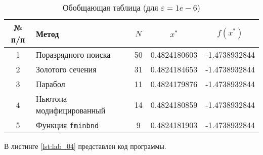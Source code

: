 \documentclass{bmstu}
\begin{document}
\begin{table}[H]
    \centering
	\caption{Обобщающая таблица (для $\varepsilon = 1e-6$)}
    \label{tbl:task}
	\begin{tabular}{|c|l|c|c|c|}
        \hline
        № п/п & Метод & $N$ & $x^*$ & $f(x^*)$ \\ \hline
        1 & Поразрядного поиска & 50 & 0.4824180603 & -1.4738932844 \\ \hline
        2 & Золотого сечения & 31 & 0.4824184653 & -1.4738932844 \\ \hline
        3 & Парабол & 11 & 0.4824179876 & -1.4738932844 \\ \hline
        4 & Ньютона модифицированный & 14 & 0.4824180859 & -1.4738932844 \\ \hline
        5 & Функция \texttt{fminbnd} & 9 & 0.4824181903 & -1.4738932844 \\ \hline
    \end{tabular}
\end{table}

В листинге \ref{lst:lab_04} представлен код программы.

\end{document}

